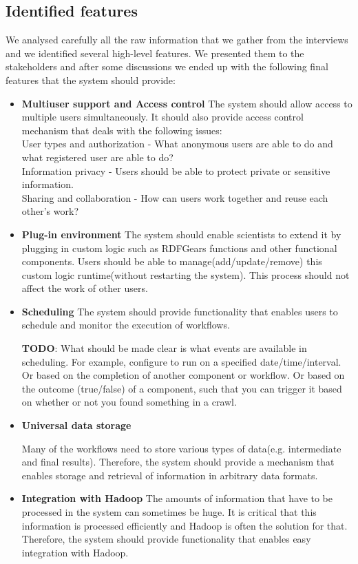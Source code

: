 \subsection{Identified features}

We analysed carefully all the raw information that we gather from the interviews and we identified several high-level features. We presented them to the stakeholders and after some discussions we ended up with the following final features that the system should provide: 

\begin{itemize}

\item \textbf{Multiuser support and Access control}
The system should allow access to multiple users simultaneously. It should also provide access control mechanism that deals with the following issues:\\
User types and authorization - What anonymous users are able to do and what registered user are able to do?\\
Information privacy - Users should be able to protect private or sensitive information.\\
Sharing and collaboration - How can users work together and reuse each other's work?

\item \textbf{Plug-in environment}
The system should enable scientists to extend it by plugging in custom logic such as RDFGears functions and other functional components. Users should be able to manage(add/update/remove) this custom logic runtime(without restarting the system). This process should not affect the work of other users.
 
\item \textbf{Scheduling}
The system should provide functionality that enables users to schedule and monitor the execution of workflows. 

\textbf{TODO}:
What should be made clear is what events are available in  scheduling. For example, configure to run on a specified date/time/interval. Or based on the completion of another component or workflow. Or based on the outcome (true/false) of a component, such that you can trigger it based on whether or not you found something in a crawl. 

\item \textbf{Universal data storage} 

Many of the workflows need to store various types of data(e.g. intermediate and final results). Therefore, the system should provide a mechanism that enables storage and retrieval of information in arbitrary data formats.

 
\item \textbf{Integration with Hadoop}
The amounts of information that have to be processed in the system can sometimes be huge. It is critical that this information is processed efficiently and Hadoop is often the solution for that. Therefore, the system should provide functionality that enables easy integration with Hadoop.

\end{itemize}


